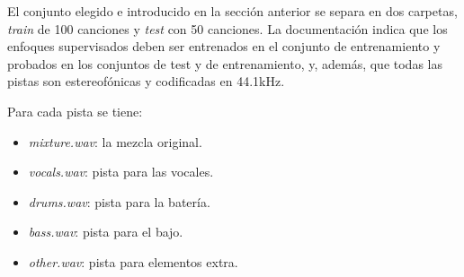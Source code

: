 El conjunto elegido e introducido en la sección anterior se separa en dos carpetas, \textit{train} de 100 canciones y \textit{test} con 50 canciones.
La documentación indica que los enfoques supervisados deben ser entrenados en el conjunto de entrenamiento y probados en los conjuntos de test y de entrenamiento, y, además, que todas las pistas son estereofónicas y codificadas en 44.1kHz.

Para cada pista se tiene:
\begin{itemize}
    \item \textit{mixture.wav}: la mezcla original.
    \item \textit{vocals.wav}: pista para las vocales.
    \item \textit{drums.wav}: pista para la batería.
    \item \textit{bass.wav}: pista para el bajo.
    \item \textit{other.wav}: pista para elementos extra. 
\end{itemize}